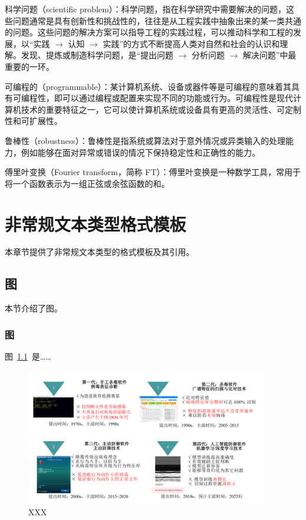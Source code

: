 \documentclass[14pt]{jnuthesis}
\begin{document}
科学问题（scientific problem）：科学问题，指在科学研究中需要解决的问题，这些问题通常是具有创新性和挑战性的，往往是从工程实践中抽象出来的某一类共通的问题。这些问题的解决方案可以指导工程的实践过程，可以推动科学和工程的发展，以“实践 $\rightarrow$ 认知 $\rightarrow$ 实践”的方式不断提高人类对自然和社会的认识和理解。发现、提炼或制造科学问题，是“提出问题 $\rightarrow$ 分析问题 $\rightarrow$ 解决问题”中最重要的一环。

可编程的（programmable）：某计算机系统、设备或器件等是可编程的意味着其具有可编程性，即可以通过编程或配置来实现不同的功能或行为。可编程性是现代计算机技术的重要特征之一，它可以使计算机系统或设备具有更高的灵活性、可定制性和可扩展性。

鲁棒性（robustness）：鲁棒性是指系统或算法对于意外情况或异类输入的处理能力，例如能够在面对异常或错误的情况下保持稳定性和正确性的能力。

傅里叶变换（Fourier transform，简称 FT）：傅里叶变换是一种数学工具，常用于将一个函数表示为一组正弦或余弦函数的和。


\chapter{非常规文本类型格式模板}
\label{chap:2}

本章节提供了非常规文本类型的格式模板及其引用。

\section{图}

本节介绍了图。

\subsection{图}

图~\ref{fig:development}~是……

\begin{figure}[htbp] %
	\centerline{\includegraphics[width=0.95\textwidth]{figs/development.pdf}} %
	\caption{XXX} %
	\label{fig:development} %
\end{figure}
\end{document}
